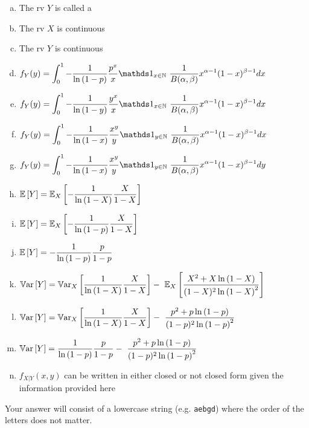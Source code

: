 \documentclass[12pt,landscape]{article}
\newcommand{\instr}{\small Your answer will consist of a lowercase string (e.g. \texttt{aebgd}) where the order of the letters does not matter. \normalsize}
\begin{document}
\benum{} 

\begin{changemargin}{-1cm}{-1cm}
\begin{multicols}{2}
\begin{enumerate}[(a)]
\item The rv $Y$ is called a 
\item The rv $X$ is continuous
\item The rv $Y$ is continuous

\item $f_Y(y) = \displaystyle\int_0^1 -\oneover{\natlog{1-p}}\frac{p^x}{x} \indic{x \in \naturals}~\oneover{B(\alpha, \beta)} x^{\alpha-1}(1-x)^{\beta-1} dx$

\item $f_Y(y) = \displaystyle\int_0^1 -\oneover{\natlog{1-y}}\frac{y^x}{x} \indic{x \in \naturals}~\oneover{B(\alpha, \beta)} x^{\alpha-1}(1-x)^{\beta-1} dx$

\item $f_Y(y) = \displaystyle\int_0^1 -\oneover{\natlog{1-x}}\frac{x^y}{y} \indic{y \in \naturals}~\oneover{B(\alpha, \beta)} x^{\alpha-1}(1-x)^{\beta-1} dx$

\item $f_Y(y) = \displaystyle\int_0^1 -\oneover{\natlog{1-x}}\frac{x^y}{y} \indic{y \in \naturals}~\oneover{B(\alpha, \beta)} x^{\alpha-1}(1-x)^{\beta-1} dy$

\item $\mathbb{E}\left[Y\right] = \mathbb{E}_{X}\left[-\displaystyle\frac{1}{\ln\left(1-X\right)}\frac{X}{1-X}\right]$
\item $\mathbb{E}\left[Y\right] = \mathbb{E}_{X}\left[-\displaystyle\frac{1}{\ln\left(1-p\right)}\frac{X}{1-X}\right]$
\item $\mathbb{E}\left[Y\right] =  -\displaystyle\frac{1}{\ln\left(1-p\right)}\frac{p}{1-p}$

\item $\mathbb{V}\text{ar}\left[Y\right] = \mathbb{V}\text{ar}_{X}\left[\displaystyle\frac{1}{\ln\left(1-X\right)}\frac{X}{1-X}\right] - ~\mathbb{E}_{X}\left[\displaystyle\frac{X^2 + X \ln\left(1-X\right)}{(1-X)^2 \ln\left(1-X\right)^2}\right]$
\item $\mathbb{V}\text{ar}\left[Y\right] = \mathbb{V}\text{ar}_{X}\left[\displaystyle\frac{1}{\ln\left(1-X\right)}\frac{X}{1-X}\right] - ~\displaystyle\frac{p^2 + p \ln\left(1-p\right)}{(1-p)^2 \ln\left(1-p\right)^2}$
\item $\mathbb{V}\text{ar}\left[Y\right] = \displaystyle\frac{1}{\ln\left(1-p\right)}\frac{p}{1-p} - ~\displaystyle\frac{p^2 + p \ln\left(1-p\right)}{(1-p)^2 \ln\left(1-p\right)^2}$

\item $f_{X|Y}(x,y)$ can be written in either closed or not closed form given the information provided here
\end{enumerate}
\end{multicols}
\end{changemargin}
\eenum\instr\pagebreak
\end{document}
